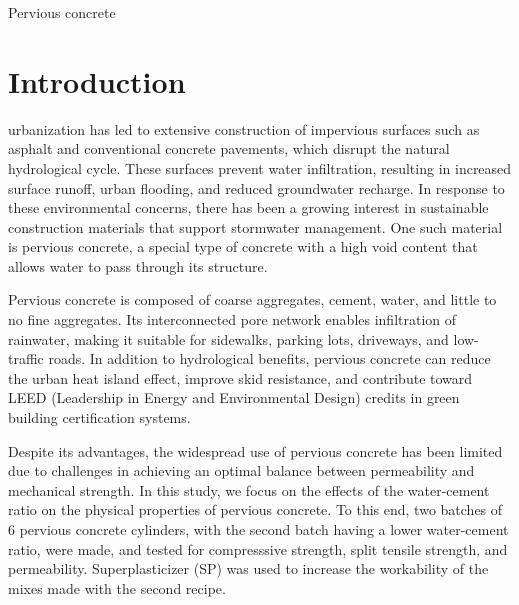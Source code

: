 \documentclass{ieeeaccess}
\begin{document}
\begin{keywords}
    Pervious concrete
\end{keywords}

\titlepgskip=-21pt

\maketitle

\section{Introduction}
\label{sec:introduction}
 urbanization has led to extensive construction of impervious 
surfaces such as asphalt and conventional concrete pavements, which disrupt the 
natural hydrological cycle. These surfaces prevent water infiltration, resulting 
in increased surface runoff, urban flooding, and reduced groundwater recharge. 
In response to these environmental concerns, there has been a growing interest 
in sustainable construction materials that support stormwater management. One 
such material is pervious concrete, a special type of concrete with a high void 
content that allows water to pass through its structure. 

Pervious concrete is composed of coarse aggregates, cement, water, and little to 
no fine aggregates. Its interconnected pore network enables infiltration of 
rainwater, making it suitable for sidewalks, parking lots, driveways, and 
low-traffic roads. In addition to hydrological benefits, pervious concrete can 
reduce the urban heat island effect, improve skid resistance, and contribute 
toward LEED (Leadership in Energy and Environmental Design) credits in green 
building certification systems. 

Despite its advantages, the widespread use of pervious concrete has been limited 
due to challenges in achieving an optimal balance between permeability and 
mechanical strength. In this study, we focus on the effects of the  water-cement 
ratio on the physical properties of pervious concrete. To this end, two batches 
of 6 pervious concrete cylinders, with the second batch having a lower 
water-cement ratio, were made, and tested for compresssive strength, split 
tensile strength, and permeability. Superplasticizer (SP) was used to increase 
the workability of the mixes made with the second recipe. 
\end{document}
